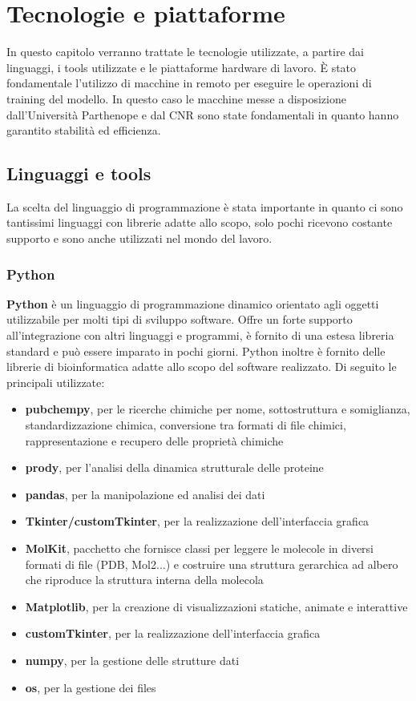 \chapter{Tecnologie e piattaforme}\label{cap:2}
In questo capitolo verranno trattate le tecnologie utilizzate, a partire dai linguaggi, i tools utilizzate e le piattaforme hardware di lavoro. È stato fondamentale l’utilizzo di macchine in remoto per eseguire le operazioni di training del modello. In questo caso le macchine messe a disposizione dall’Università Parthenope e dal CNR sono state fondamentali in quanto hanno garantito stabilità ed efficienza.

\section{Linguaggi e tools}\label{sec:2.1}
La scelta del linguaggio di programmazione è stata importante in quanto ci sono tantissimi linguaggi con librerie adatte allo scopo, solo pochi ricevono costante supporto e sono anche utilizzati nel mondo del lavoro.

\subsection{Python}\label{sec:2.1.1}
\textbf{Python} è un linguaggio di programmazione dinamico orientato agli oggetti utilizzabile per molti tipi  di sviluppo software. Offre un forte supporto all'integrazione con altri linguaggi e programmi, è fornito di una estesa libreria standard e può essere imparato in pochi giorni. Python inoltre è fornito delle librerie di bioinformatica adatte allo scopo del software realizzato. Di seguito le principali utilizzate:

\begin{itemize}
    \item \textbf{pubchempy}, per le ricerche chimiche per nome, sottostruttura e somiglianza, standardizzazione chimica, conversione tra formati di file chimici, rappresentazione e recupero delle proprietà chimiche
    \item \textbf{prody}, per l'analisi della dinamica strutturale delle proteine
    \item \textbf{pandas}, per la manipolazione ed analisi dei dati
    \item \textbf{Tkinter/customTkinter}, per la realizzazione dell'interfaccia grafica
    \item \textbf{MolKit}, pacchetto che fornisce classi per leggere le molecole in diversi formati di file (PDB, Mol2...) e costruire una struttura gerarchica ad albero che riproduce la struttura interna della molecola
    \item \textbf{Matplotlib}, per la creazione di visualizzazioni statiche, animate e interattive
    \item \textbf{customTkinter}, per la realizzazione dell'interfaccia grafica
    \item \textbf{numpy}, per la gestione delle strutture dati
    \item \textbf{os}, per la gestione dei files
\end{itemize} 

